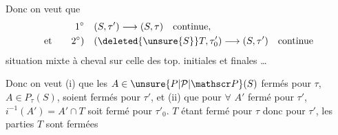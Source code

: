 Donc on veut que
\[
\begin{aligned}
 1^\circ\quad &(S,\tau')\longrightarrow(S,\tau)\quad\text{continue},\\
 \text{et}\qquad 2^\circ)\quad &(\deleted{\unsure{S}}T,\tau'_0)\longrightarrow(S,\tau')\quad\text{continue}
\end{aligned}
\]
situation mixte à cheval sur celle des top. initiales et finales \ldots
{}

Donc on veut (i) que les $A\in\unsure{P|\mathcal P|\mathscr P}(S)$ fermés pour $\tau$,  $A\in P_\tau(S)$, soient fermés pour $\tau'$,  et (ii) que pour \uline{$\forall$} $A'$ fermé pour $\tau'$, $i^{-1}(A')=A'\cap T$ soit fermé pour $\tau'_0$.  $T$ étant fermé  pour $\tau$ donc pour $\tau'$, les parties    $T$  sont fermées
